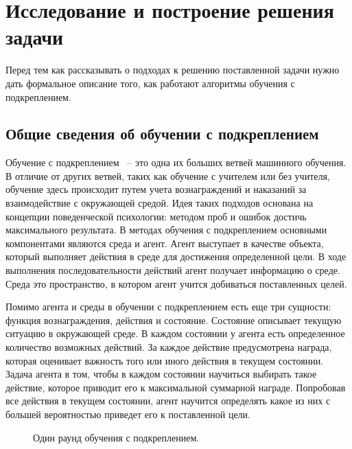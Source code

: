 \section{Исследование и построение решения задачи}
\label{sec:Chapter3} 

Перед тем как рассказывать о подходах к решению поставленной задачи нужно дать формальное описание того, как работают алгоритмы обучения с подкреплением.

\subsection{Общие сведения об обучении с подкреплением}

Обучение с подкреплением~\cite{szepesvari2010algorithms} -- это одна их больших ветвей машинного обучения. В отличие от других ветвей, таких как обучение с учителем или без учителя, обучение здесь происходит путем учета вознаграждений и наказаний за взаимодействие с окружающей средой. Идея таких подходов основана на концепции поведенческой психологии: методом проб и ошибок достичь максимального результата. В методах обучения с подкреплением основными компонентами являются среда и агент. Агент выступает в качестве объекта, который выполняет действия в среде для достижения определенной цели. В ходе выполнения последовательности действий агент получает информацию о среде. Среда это пространство, в котором агент учится добиваться поставленных целей. 

Помимо агента и среды в обучении с подкреплением есть еще три сущности: функция вознаграждения, действия и состояние. Состояние описывает текущую ситуацию в окружающей среде. В каждом состоянии у агента есть определенное количество возможных действий. За каждое действие предусмотрена награда, которая оценивает важность того или иного действия в текущем состоянии. Задача агента в том, чтобы в каждом состоянии научиться выбирать такое действие, которое приводит его к максимальной суммарной награде. Попробовав все действия в текущем состоянии, агент научится определять какое из них с большей вероятностью приведет его к поставленной цели.

\begin{figure}[h]
\caption{Один раунд обучения с подкреплением.}
\label{RLexplanation}
\end{figure}

